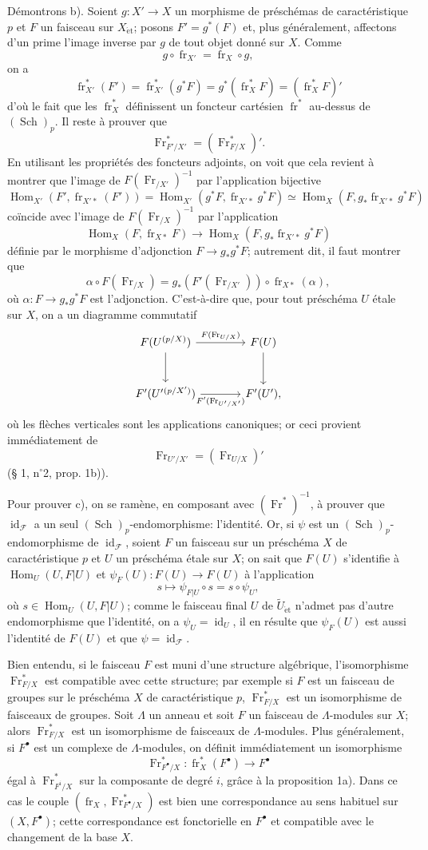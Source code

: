 \documentclass[11pt]{article}
\DeclareMathOperator{\Hom}{Hom}
\providecommand{\et}{\mathrm{\acute{e}t}}
\providecommand{\id}{\operatorname{id}}
\providecommand{\Hom}{\operatorname{Hom}}
\providecommand{\id}{\operatorname{id}}
\providecommand{\id}{\operatorname{id}}
\providecommand{\id}{\operatorname{id}}
\providecommand{\id}{\operatorname{id}}
\providecommand{\Hom}{\operatorname{Hom}}
\providecommand{\fr}{\operatorname{fr}}
\providecommand{\Fr}{\operatorname{Fr}}
\providecommand{\Sch}{\operatorname{Sch}}
\providecommand{\Fr}{\operatorname{Fr}}
\providecommand{\fr}{\operatorname{fr}}
\providecommand{\Sch}{\operatorname{Sch}}
\providecommand{\id}{\operatorname{id}}
\providecommand{\et}{\acute{e}t}
\begin{document}
Démontrons b). Soient $g:X'\to X$ un morphisme de préschémas de caractéristique $p$ et $F$ un faisceau sur $X_{\et}$; posons $F'=g^*(F)$ et, plus généralement, affectons d'un prime l'image inverse par $g$ de tout objet donné sur $X$. Comme
\[
g\circ\fr_{X'}=\fr_X\circ g,
\]
on a
\[
\fr_{X'}^*(F')=\fr_{X'}^*(g^*F)=g^*(\fr_X^*F)=(\fr_X^*F)'
\]
d'où le fait que les $\fr_X^*$ définissent un foncteur cartésien $\fr^*$ au-dessus de $(\Sch)_p$. Il reste à prouver que
\[
\Fr^*_{F'/X'}=(\Fr^*_{F/X})'.
\]
En utilisant les propriétés des foncteurs adjoints, on voit que cela revient à montrer que l'image de $F(\Fr_{/X'})^{-1}$ par l'application bijective
\[
\Hom_{X'}(F',\fr_{X'*}(F'))
 =\Hom_{X'}(g^*F,\fr_{X'*}g^*F)
 \simeq \Hom_X(F,g_*\fr_{X'*}g^*F)
\]
coïncide avec l'image de $F(\Fr_{/X})^{-1}$ par l'application
\[
\Hom_X(F,\fr_{X*}F)\longrightarrow
\Hom_X(F,g_*\fr_{X'*}g^*F)
\]
définie par le morphisme d'adjonction $F\to g_*g^*F$; autrement dit, il faut montrer que
\[
\alpha\circ F(\Fr_{/X})=g_*(F'(\Fr_{/X'}))\circ\fr_{X*}(\alpha),
\]
où $\alpha:F\to g_*g^*F$ est l'adjonction. C'est-à-dire que, pour tout préschéma $U$ étale sur $X$, on a un diagramme commutatif
\[
\begin{tikzcd}[column sep=large,row sep=large]
F(U^{(p/X)}) \arrow[r,"F(\Fr_{U/X})"] \arrow[d]
& F(U) \arrow[d]\\
F'(U'{}^{(p/X')}) \arrow[r,"F'(\Fr_{U'/X'})"']
& F'(U') ,
\end{tikzcd}
\]
où les flèches verticales sont les applications canoniques; or ceci provient immédiatement de
\[
\Fr_{U'/X'}=(\Fr_{U/X})'
\]
(§ 1, n$^\circ$2, prop. 1b)).

Pour prouver c), on se ramène, en composant avec $(\Fr^*)^{-1}$, à prouver que $\id_{\mathcal F}$ a un seul $(\Sch)_p$-endomorphisme: l'identité. Or, si $\psi$ est un $(\Sch)_p$-endomorphisme de $\id_{\mathcal F}$, soient $F$ un faisceau sur un préschéma $X$ de caractéristique $p$ et $U$ un préschéma étale sur $X$; on sait que $F(U)$ s'identifie à $\Hom_U(U,F|U)$ et $\psi_F(U):F(U)\to F(U)$ à l'application
\[
s\longmapsto \psi_{F|U}\circ s=s\circ\psi_U,
\]
où $s\in\Hom_U(U,F|U)$; comme le faisceau final $U$ de $\widetilde U_{\et}$ n'admet pas d'autre endomorphisme que l'identité, on a $\psi_U=\id_U$, il en résulte que $\psi_F(U)$ est aussi l'identité de $F(U)$ et que $\psi=\id_{\mathcal F}$.

Bien entendu, si le faisceau $F$ est muni d'une structure algébrique, l'isomorphisme $\Fr^*_{F/X}$ est compatible avec cette structure; par exemple si $F$ est un faisceau de groupes sur le préschéma $X$ de caractéristique $p$, $\Fr^*_{F/X}$ est un isomorphisme de faisceaux de groupes. Soit $\Lambda$ un anneau et soit $F$ un faisceau de $\Lambda$-modules sur $X$; alors $\Fr^*_{F/X}$ est un isomorphisme de faisceaux de $\Lambda$-modules. Plus généralement, si $F^\bullet$ est un complexe de $\Lambda$-modules, on définit immédiatement un isomorphisme
\[
\Fr^*_{F^\bullet/X}:\fr_X^*(F^\bullet)\longrightarrow F^\bullet
\]
égal à $\Fr^*_{F^i/X}$ sur la composante de degré $i$, grâce à la proposition 1a). Dans ce cas le couple $(\fr_X,\Fr^*_{F^\bullet/X})$ est bien une correspondance au sens habituel sur $(X,F^\bullet)$; cette correspondance est fonctorielle en $F^\bullet$ et compatible avec le changement de la base $X$.
\end{document}
